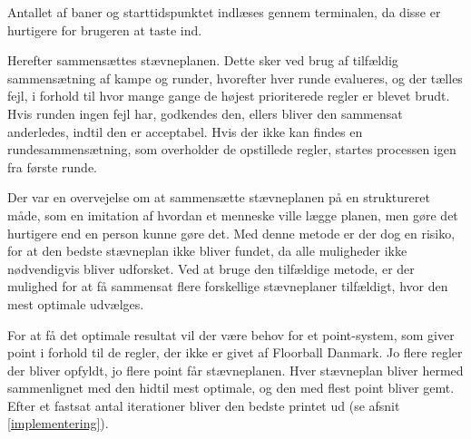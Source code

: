 Antallet af baner og starttidspunktet indlæses gennem terminalen, da disse er hurtigere for brugeren at taste ind.
\par
Herefter sammensættes stævneplanen. Dette sker ved brug af tilfældig sammensætning af kampe og runder, hvorefter hver runde evalueres, og der tælles fejl, i forhold til hvor mange gange de højest prioriterede regler er blevet brudt. Hvis runden ingen fejl har, godkendes den, ellers bliver den sammensat anderledes, indtil den er acceptabel. Hvis der ikke kan findes en rundesammensætning, som overholder de opstillede regler, startes processen igen fra første runde.
\par
Der var en overvejelse om at sammensætte stævneplanen på en struktureret måde, som en imitation af hvordan et menneske ville lægge planen, men gøre det hurtigere end en person kunne gøre det. Med denne metode er der dog en risiko, for at den bedste stævneplan ikke bliver fundet, da alle muligheder ikke nødvendigvis bliver udforsket. Ved at bruge den tilfældige metode, er der mulighed for at få sammensat flere forskellige stævneplaner tilfældigt, hvor den mest optimale udvælges.
\par
For at få det optimale resultat vil der være behov for et point-system, som giver point i forhold til de regler, der ikke er givet af Floorball Danmark. Jo flere regler der bliver opfyldt, jo flere point får stævneplanen. Hver stævneplan bliver hermed sammenlignet med den hidtil mest optimale, og den med flest point bliver gemt. Efter et fastsat antal iterationer bliver den bedste printet ud (se afsnit \ref{implementering}).


